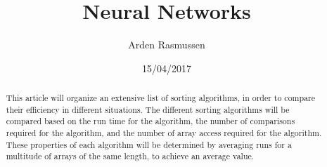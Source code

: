 \documentclass[10pt]{article}
\title{Neural Networks}
\author{Arden Rasmussen}
\date{15/04/2017}
\begin{document}
\maketitle
\newpage
\tableofcontents
\newpage
{}
\begin{abstract}
This article will organize an extensive list of sorting algorithms, in order to compare their efficiency in different situations. The different sorting algorithms will be compared based on the run time for the algorithm, the number of comparisons required for the algorithm, and the number of array access required for the algorithm. These properties of each algorithm will be determined by averaging runs for a multitude of arrays of the same length, to achieve an average value.
\end{abstract}
\newpage


\end{document}
